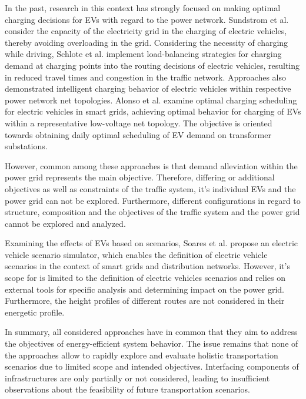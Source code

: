 In the past, research in this context has strongly focused on making optimal charging decisions for EVs with regard to the power network.
Sundstrom et al. \cite{sundstrom2010planning} consider the capacity of the electricity grid in the charging of electric vehicles, thereby avoiding overloading in the grid.
Considering the necessity of charging while driving, Schlote et al. \cite{schlote2012balanced} implement load-balancing strategies for charging demand at charging points into the routing decisions of electric vehicles, resulting in reduced travel times and congestion in the traffic network. Approaches also demonstrated intelligent charging behavior of electric vehicles within respective power network net topologies. Alonso et al. \cite{alonso2014optimal} examine optimal charging scheduling for electric vehicles in smart grids, achieving optimal behavior for charging of EVs within a representative low-voltage net topology. The objective is oriented towards obtaining daily optimal scheduling of EV demand on transformer substations.

However, common among these approaches is that demand alleviation within the power grid represents the main objective. Therefore, differing or additional objectives as well as constraints of the traffic system, it's individual EVs and the power grid can not be explored. Furthermore, different configurations in regard to structure, composition and the objectives of the traffic system and the power grid cannot be explored and analyzed. 

Examining the effects of EVs based on scenarios, Soares et al. \cite{soares2012electric} propose an electric vehicle scenario simulator, which enables the definition of electric vehicle scenarios in the context of smart grids and distribution networks. However, it's scope for is limited to the definition of electric vehicles scenarios and relies on external tools for specific analysis and determining impact on the power grid. Furthermore, the height profiles of different routes are not considered in their energetic profile.

In summary, all considered approaches have in common that they aim to address the objectives of energy-efficient system behavior. The issue remains that none of the approaches allow to rapidly explore and evaluate holistic transportation scenarios due to limited scope and intended objectives. Interfacing components of infrastructures are only partially or not considered, leading to insufficient observations about the feasibility of future transportation scenarios.


